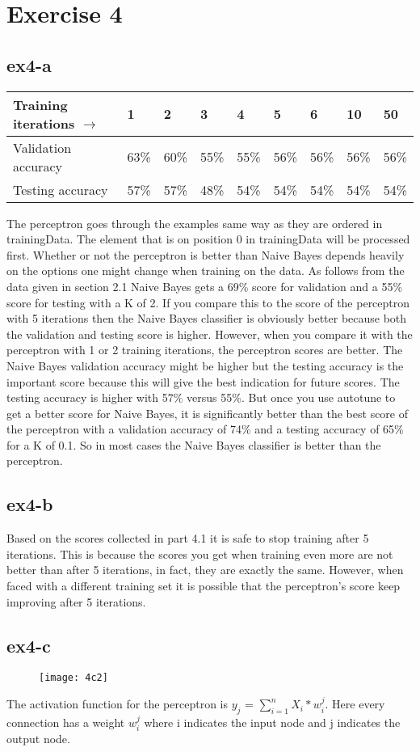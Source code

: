 \section{Exercise 4}
\subsection{ex4-a}
\begin{table}[!htbp]
\begin{tabular}{|l||l|l|l|l|l|l|l|l|}
\hline
Training iterations $\rightarrow$  & 1   & 2 & 3 & 4 & 5 & 6 & 10 & 50 \\ \hline
Validation accuracy  & 63\% & 60\% & 55\% & 55\% & 56\% & 56\% & 56\% & 56\% \\ 
Testing accuracy    & 57\% & 57\% & 48\% & 54\% & 54\% & 54\% & 54\% & 54\% \\ \hline
\end{tabular}
\end{table}
The perceptron goes through the examples same way as they are ordered in trainingData. 
The element that is on position 0 in trainingData will be processed first.
Whether or not the perceptron is better than Naive Bayes depends heavily on the options 
one might change when training on the data. As follows from the data given in section 2.1 
Naive Bayes gets a 69\% score for validation and a 55\% score for testing with a K of 2. 
If you compare this to the score of the perceptron with 5 iterations then the Naive Bayes 
classifier is obviously better because both the validation and testing score is higher.
However, when you compare it with the perceptron with 1 or 2 training iterations, the perceptron
scores are better. The Naive Bayes validation accuracy might be higher but the testing accuracy
is the important score because this will give the best indication for future scores. 
The testing accuracy is higher with 57\% versus 55\%.
But once you use autotune to get a better score for Naive Bayes, it is significantly better
than the best score of the perceptron with a validation accuracy of 74\% and a testing accuracy 
of 65\% for a K of 0.1. So in most cases the Naive Bayes classifier is better than the perceptron.

\subsection{ex4-b}
Based on the scores collected in part 4.1 it is safe to stop training after 5 iterations. 
This is because the scores you get when training even more are not better than after 5 iterations, 
in fact, they are exactly the same. However, when faced with a different training set it is 
possible that the perceptron's score keep improving after 5 iterations.

\subsection{ex4-c}
\begin{figure}[H]
\caption{}
\centering
\texttt{[image: 4c2]}
\end{figure}
The activation function for the perceptron is $y_j$ = $\sum_{i=1}^{n} X_i * w_i^j$. Here every 
connection has a weight $w_i^j$ where i indicates the input node and j indicates the output node.
